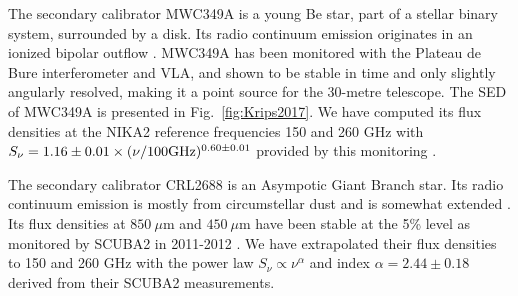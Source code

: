 %

\label{se:fluxSec}

The secondary calibrator MWC349A is a young Be star, part of a stellar
binary system, surrounded by a disk. Its radio continuum emission
originates in an ionized bipolar outflow \cite{Tafoya}.  MWC349A has
been monitored with the Plateau de Bure interferometer and VLA, and
shown to be stable in time and only slightly angularly resolved,
making it a point source for the 30-metre telescope. The SED of
MWC349A \cite{krips} is presented in Fig.~\ref{fig:Krips2017}. We have
computed its flux densities at the NIKA2 reference frequencies 150 and
260 GHz with $S_\nu = 1.16\pm0.01 \times
(\nu/100 \rm{GHz})^{0.60\pm0.01}$ provided by this
monitoring \cite{krips}.



The secondary calibrator CRL2688 is an Asympotic Giant Branch
star. Its radio continuum emission is mostly from circumstellar dust
and is somewhat extended \cite{Knapp}.  Its flux densities at
$850\ \mu$m and $450 \ \mu$m have been stable at the 5\% level as
monitored by SCUBA2 in 2011-2012
\cite{Dempsey}. We have extrapolated their flux densities to  150 and 260 GHz
with the power law $S_{\nu} \propto \nu^{\alpha}$ and index
$\alpha=2.44\pm0.18$ derived from their SCUBA2 measurements.

